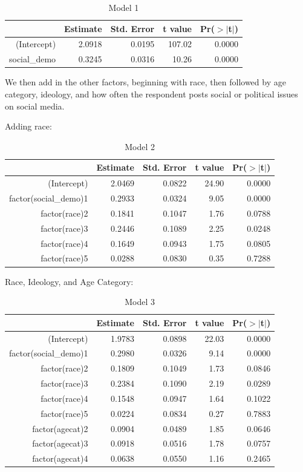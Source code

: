 \documentclass[
]{article}
\begin{document}
\begin{table}[ht]
\centering
\caption{Model 1} 
\begin{tabular}{rrrrr}
  \hline
 & Estimate & Std. Error & t value & Pr($>$$|$t$|$) \\ 
  \hline
(Intercept) & 2.0918 & 0.0195 & 107.02 & 0.0000 \\ 
  social\_demo & 0.3245 & 0.0316 & 10.26 & 0.0000 \\ 
   \hline
\end{tabular}
\end{table}

We then add in the other factors, beginning with race, then followed by
age category, ideology, and how often the respondent posts social or
political issues on social media.

Adding race:

\begin{table}[ht]
\centering
\caption{Model 2} 
\begin{tabular}{rrrrr}
  \hline
 & Estimate & Std. Error & t value & Pr($>$$|$t$|$) \\ 
  \hline
(Intercept) & 2.0469 & 0.0822 & 24.90 & 0.0000 \\ 
  factor(social\_demo)1 & 0.2933 & 0.0324 & 9.05 & 0.0000 \\ 
  factor(race)2 & 0.1841 & 0.1047 & 1.76 & 0.0788 \\ 
  factor(race)3 & 0.2446 & 0.1089 & 2.25 & 0.0248 \\ 
  factor(race)4 & 0.1649 & 0.0943 & 1.75 & 0.0805 \\ 
  factor(race)5 & 0.0288 & 0.0830 & 0.35 & 0.7288 \\ 
   \hline
\end{tabular}
\end{table}

Race, Ideology, and Age Category:

\begin{table}[ht]
\centering
\caption{Model 3} 
\begin{tabular}{rrrrr}
  \hline
 & Estimate & Std. Error & t value & Pr($>$$|$t$|$) \\ 
  \hline
(Intercept) & 1.9783 & 0.0898 & 22.03 & 0.0000 \\ 
  factor(social\_demo)1 & 0.2980 & 0.0326 & 9.14 & 0.0000 \\ 
  factor(race)2 & 0.1809 & 0.1049 & 1.73 & 0.0846 \\ 
  factor(race)3 & 0.2384 & 0.1090 & 2.19 & 0.0289 \\ 
  factor(race)4 & 0.1548 & 0.0947 & 1.64 & 0.1022 \\ 
  factor(race)5 & 0.0224 & 0.0834 & 0.27 & 0.7883 \\ 
  factor(agecat)2 & 0.0904 & 0.0489 & 1.85 & 0.0646 \\ 
  factor(agecat)3 & 0.0918 & 0.0516 & 1.78 & 0.0757 \\ 
  factor(agecat)4 & 0.0638 & 0.0550 & 1.16 & 0.2465 \\ 
   \hline
\end{tabular}
\end{table}
\end{document}
